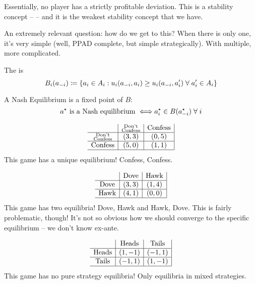\documentclass[10pt]{article}
\begin{document}
Essentially, no player has a strictly profitable deviation. This is a stability concept --  -- and it is the weakest stability concept that we have. 

An extremely relevant question: how do we get to this? When there is only one, it's very simple (well, PPAD complete, but simple strategically). With multiple, more complicated.

\begin{definition}
	The  is
	\[
	B_i(a_{-i}) \coloneqq \curll a_i \in A_i : u_i(a_{-i},a_i) \ge u_i(a_{-i},a_i') \forall a_i' \in A_i \curlr
	\]
\end{definition}

\begin{proposition}
	A Nash Equilibrium is a fixed point of $B$: \[a\opt \textnormal{ is a Nash equilibrium }\Longleftrightarrow a\opt_i \in B(a\opt_{-i}) \forall i\]
\end{proposition}

\begin{example}
	\[
	\begin{array}{c|c|c|}
		& \substack{\text{Don't}\\ \text{Confess}} & \text{Confess} \\\hline
		\substack{\text{Don't}\\ \text{Confess}} & (3,3) & (0,5) \\\hline
		\text{Confess} & (5,0) & (1,1) \\\hline
	\end{array}
	\]
	This game has a unique equilibrium! Confess, Confess.
\end{example}

\begin{example}
	\[
	\begin{array}{c|c|c|}
		& \text{Dove} & \text{Hawk} \\\hline
		\text{Dove} & (3,3) & (1,4) \\\hline
		\text{Hawk} & (4,1) & (0,0) \\\hline
	\end{array}
	\]
	This game has two equilibria! Dove, Hawk and Hawk, Dove. This is fairly problematic, though! It's not so obvious how we should converge to the specific equilibrium -- we don't know ex-ante.
\end{example}

\begin{example}
	\[
	\begin{array}{c|c|c|}
		& \text{Heads} & \text{Tails} \\\hline
		\text{Heads} & (1,-1) & (-1,1) \\\hline
		\text{Tails} & (-1,1) & (1,-1) \\\hline
	\end{array}
	\]
	This game has no pure strategy equilibria! Only equilibria in mixed strategies.
\end{example}
\end{document}
